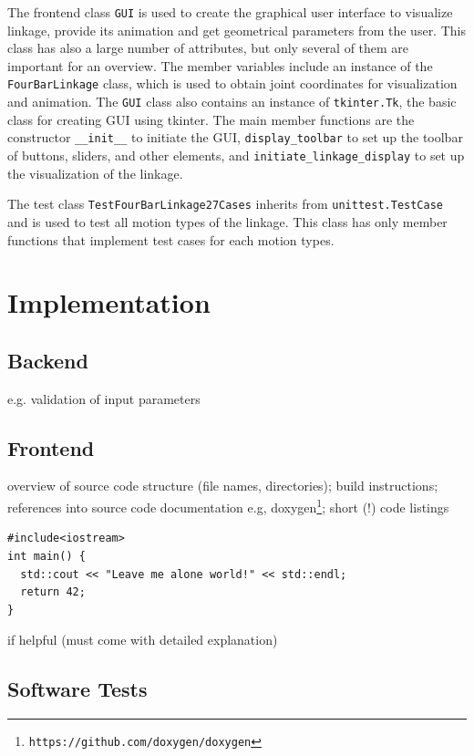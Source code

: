\documentclass{article}
\begin{document}
The frontend class \texttt{GUI} is used to create the graphical user interface to visualize linkage, provide its animation and get geometrical parameters from the user. This class has also a large number of attributes, but only several of them are important for an overview. The member variables include an instance of the \texttt{FourBarLinkage} class, which is used to obtain joint coordinates for visualization and animation. The \texttt{GUI} class also contains an instance of \texttt{tkinter.Tk}, the basic class for creating GUI using tkinter. The main member functions are the constructor \texttt{\_\_init\_\_} to initiate the GUI, \texttt{display\_toolbar} to set up the toolbar of buttons, sliders, and other elements, and \texttt{initiate\_linkage\_display} to set up the visualization of the linkage.

The test class \texttt{TestFourBarLinkage27Cases} inherits from \texttt{unittest.TestCase} and is used to test all motion types of the linkage. This class has only member functions that implement test cases for each motion types.

\section{Implementation} \label{ch:implementation}

\subsection{Backend}
e.g. validation of input parameters

\subsection{Frontend}

overview of source code structure (file names, directories); build instructions; references into source code documentation e.g, doxygen\footnote{\tt https://github.com/doxygen/doxygen}; short (!) code listings
\begin{lstlisting}
#include<iostream>
int main() {
  std::cout << "Leave me alone world!" << std::endl;
  return 42;
}
\end{lstlisting}
if helpful (must come with detailed explanation)

\subsection{Software Tests}
\end{document}
